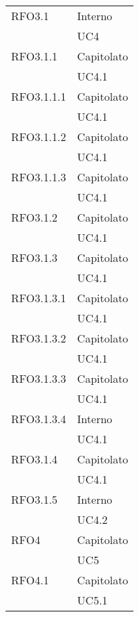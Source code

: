 \begin{center}
\begin{longtable}{ | >{\centering\arraybackslash}m{5cm} | >{\centering\arraybackslash}m{5cm} | }
        RFO3.1 & Interno\\
            & UC4 \\
\hline

        RFO3.1.1 & Capitolato\\
            & UC4.1 \\
\hline

        RFO3.1.1.1 & Capitolato\\
            & UC4.1 \\
\hline

        RFO3.1.1.2 & Capitolato\\
            & UC4.1 \\
\hline

        RFO3.1.1.3 & Capitolato\\
            & UC4.1 \\
\hline

        RFO3.1.2 & Capitolato\\
            & UC4.1 \\
\hline

        RFO3.1.3 & Capitolato\\
            & UC4.1 \\
\hline

        RFO3.1.3.1 & Capitolato\\
            & UC4.1 \\
\hline

        RFO3.1.3.2 & Capitolato\\
            & UC4.1 \\
\hline

        RFO3.1.3.3 & Capitolato\\
            & UC4.1 \\
\hline

        RFO3.1.3.4 & Interno\\
            & UC4.1 \\
\hline

        RFO3.1.4 & Capitolato\\
            & UC4.1 \\
\hline

        RFO3.1.5 & Interno\\
            & UC4.2 \\
\hline

        RFO4 & Capitolato\\
            & UC5 \\
\hline

        RFO4.1 & Capitolato\\
            & UC5.1 \\
\hline


\end{longtable}
\end{center}
